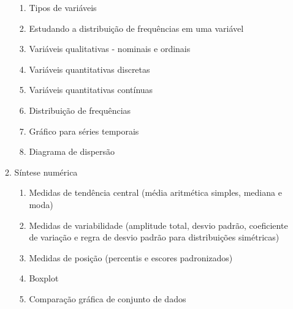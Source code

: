 \begin{enumerate}
\begin{enumerate}
\begin{enumerate}
				\item Tipos de variáveis
				\item Estudando a distribuição de frequências em uma variável
				\item Variáveis qualitativas - nominais e ordinais
				\item Variáveis quantitativas discretas
				\item Variáveis quantitativas contínuas
				\item Distribuição de frequências
				\item Gráfico para séries temporais
				\item Diagrama de dispersão
			\end{enumerate}
			\item Síntese numérica
			\begin{enumerate}
				\item Medidas de tendência central (média aritmética simples, mediana e moda)
				\item Medidas de variabilidade (amplitude total, desvio padrão, coeficiente de variação e regra de desvio padrão para distribuições simétricas)
				\item Medidas de posição (percentis e escores padronizados)
				\item Boxplot
				\item Comparação gráfica de conjunto de dados
			\end{enumerate}
		\end{enumerate}
\end{enumerate}
